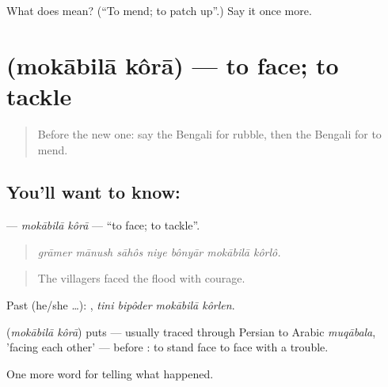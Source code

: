 \begin{tcolorbox}[breakable,colback=teal!4,colframe=teal!35!black,title={Before you move on}]
What does   mean? (\textquotedblleft{}To mend; to patch up\textquotedblright{}.) Say it once more.
\end{tcolorbox}
\section[\texorpdfstring{\bn{মোকাবিলা} \bn{করা} (mokābilā kôrā)}{মোকাবিলা করা (mokābilā kôrā)}]{  (mokābilā kôrā) — to face; to tackle}

\label{lesson:BN-C295-mokabila-kora}



\begin{quote}
Before the new one: say the Bengali for rubble, then the Bengali for to mend.
\end{quote}

\subsection*{You'll want to know:  }
\textbf{ } — \emph{mokābilā kôrā} — \textquotedblleft{}to face; to tackle\textquotedblright{}.

\begin{quote}
      
\end{quote}

\begin{quote}
\emph{grāmer mānush sāhôs niye bônyār mokābilā kôrlô.}
\end{quote}

\begin{quote}
The villagers faced the flood with courage.
\end{quote}

Past (he/she …):    , \emph{tini bipôder mokābilā kôrlen}.

\begin{cousinweb}
\textbf{ } (\emph{mokābilā kôrā}) puts  — usually traced through Persian to Arabic \emph{muqābala}, 'facing each other' — before : to stand face to face with a trouble.
\end{cousinweb}

\begin{grammarlens}[title={What you've built}]
One more word for telling what happened.
\end{grammarlens}

